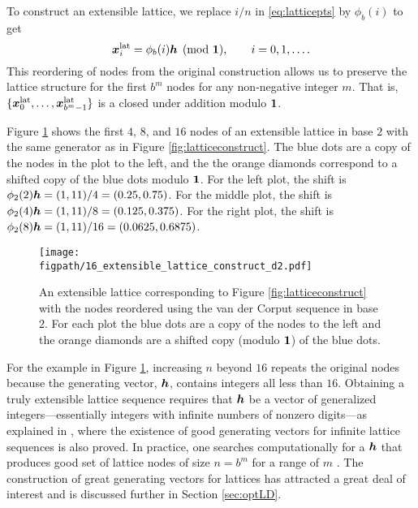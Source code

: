 \documentclass{svproc}
\newcommand{\figpath}{Figures}
\begin{document}
To construct an extensible lattice, we replace $i/n$ in \eqref{eq:latticepts} by $\phi_b(i)$ to get
\begin{equation} \label{eq:extensiblelattice}
	{\boldsymbol{x}}_i^{\text{lat}} =\phi_b( i){\boldsymbol{h}} \pmod {{\boldsymbol{1}}}, \qquad i = 0, 1 , \ldots.
\end{equation}
This reordering of nodes from the original construction allows us to preserve the lattice structure for the first $b^m$ nodes for any non-negative integer $m$. That is, $\{{\boldsymbol{x}}^{\text{lat}}_0, \ldots, {\boldsymbol{x}}^{\text{lat}}_{b^m-1}\}$ is a closed under addition modulo ${\boldsymbol{1}}$.

Figure \ref{fig:extensiblelatticeconstruct} shows the first $4$, $8$, and $16$ nodes of an extensible lattice in base $2$ with the same generator as in Figure \ref{fig:latticeconstruct}.  The blue dots are a copy of the nodes in the plot to the left, and the the orange diamonds correspond to a shifted copy of the blue dots modulo ${\boldsymbol{1}}$.  For the left plot, the shift is $\phi_2(2){\boldsymbol{h}} = (1,11)/4=(0.25,0.75)$.  For the middle plot, the shift is $\phi_2(4){\boldsymbol{h}} = (1,11)/8=(0.125,0.375)$. For the right plot, the shift is $\phi_2(8){\boldsymbol{h}} = (1,11)/16=(0.0625,0.6875)$.

\begin{figure}
	\centering
	\texttt{[image: \\figpath/16\_extensible\_lattice\_construct\_d2.pdf]}
	\caption{An extensible lattice corresponding to  Figure \ref{fig:latticeconstruct}  with the nodes reordered using the van der Corput sequence in base $2$.  For each plot the blue dots are a copy of the nodes to the left and the orange diamonds are a shifted copy (modulo ${\boldsymbol{1}}$) of the blue dots. \label{fig:extensiblelatticeconstruct}}
\end{figure}

For the example in Figure \ref{fig:extensiblelatticeconstruct}, increasing $n$ beyond $16$ repeats the original nodes because the generating vector, ${\boldsymbol{h}}$, contains integers all less than $16$.  Obtaining a truly extensible lattice sequence requires that ${\boldsymbol{h}}$ be a vector of generalized integers---essentially integers with infinite numbers of nonzero digits---as explained in \cite{HicNie03a}, where the existence of good generating vectors for infinite lattice sequences is also proved.  In practice, one searches computationally for a ${\boldsymbol{h}}$ that produces good set of lattice nodes of size $n = b^m$ for a range of $m$ \cite{HicEtal00}. The construction of great generating vectors for lattices has attracted a great deal of interest and is discussed further in Section \ref{sec:optLD}. 
\end{document}
